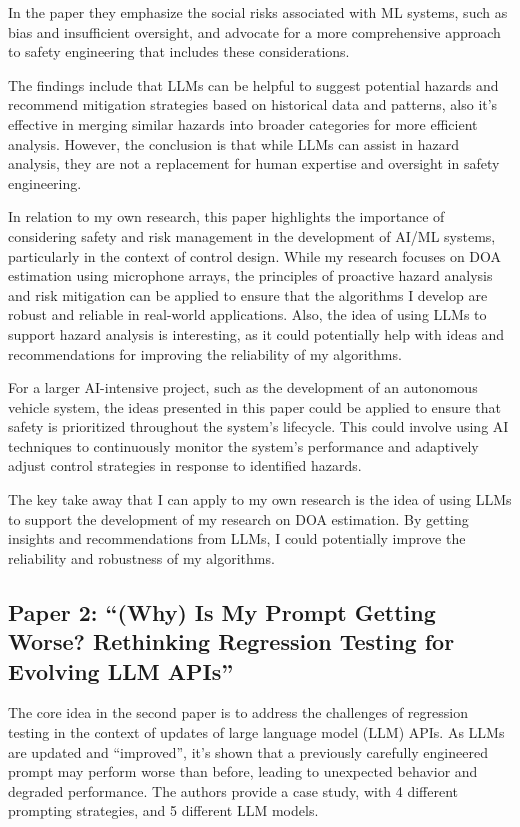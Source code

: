 \documentclass[a4paper,11pt]{article}
\begin{document}
In the paper they emphasize the social risks associated with ML systems, such as bias and insufficient oversight, and advocate for a more comprehensive approach to safety engineering that includes these considerations.

The findings include that LLMs can be helpful to suggest potential hazards and recommend mitigation strategies based on historical data and patterns, also it's effective in merging similar hazards into broader categories for more efficient analysis.
However, the conclusion is that while LLMs can assist in hazard analysis, they are not a replacement for human expertise and oversight in safety engineering.

In relation to my own research, this paper highlights the importance of considering safety and risk management in the development of AI/ML systems, particularly in the context of control design. While my research focuses on DOA estimation using microphone arrays, the principles of proactive hazard analysis and risk mitigation can be applied to ensure that the algorithms I develop are robust and reliable in real-world applications.
Also, the idea of using LLMs to support hazard analysis is interesting, as it could potentially help with ideas and recommendations for improving the reliability of my algorithms.

For a larger AI-intensive project, such as the development of an autonomous vehicle system, the ideas presented in this paper could be applied to ensure that safety is prioritized throughout the system's lifecycle. This could involve using AI techniques to continuously monitor the system's performance and adaptively adjust control strategies in response to identified hazards.

The key take away that I can apply to my own research is the idea of using LLMs to support the development of my research on DOA estimation. By getting insights and recommendations from LLMs, I could potentially improve the reliability and robustness of my algorithms. 

\subsection{Paper 2: ``(Why) Is My Prompt Getting Worse? Rethinking Regression Testing for Evolving LLM APIs''}
The core idea in the second paper \cite{Ma2024} is to address the challenges of regression testing in the context of updates of large language model (LLM) APIs. As LLMs are updated and ``improved'', it's shown that a previously carefully engineered prompt may perform worse than before, leading to unexpected behavior and degraded performance. The authors provide a case study, with 4 different prompting strategies, and 5 different LLM models. 
\end{document}

